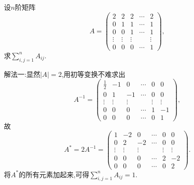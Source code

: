 \documentclass[lang=cn,newtx,10pt,scheme=chinese]{elegantbook}
\begin{document}
\begin{exercise}
设\(n\)阶矩阵
\[
A = 
\begin{pmatrix}
2 & 2 & 2 & \cdots & 2 \\
0 & 1 & 1 & \cdots & 1 \\
0 & 0 & 1 & \cdots & 1 \\
\vdots & \vdots & \vdots & & \vdots \\
0 & 0 & 0 & \cdots & 1
\end{pmatrix},
\]
求\(\sum_{i,j = 1}^{n} A_{ij}\).
\end{exercise}
\begin{solution}
    {\color{blue}解法一:}显然\(\vert A\vert = 2\),用初等变换不难求出
    \[
    A^{-1} = 
    \begin{pmatrix}
    \frac{1}{2} & -1 & 0 & \cdots & 0 & 0 \\
    0 & 1 & -1 & \cdots & 0 & 0 \\
    \vdots & \vdots & \vdots & & \vdots & \vdots \\
    0 & 0 & 0 & \cdots & 1 & -1 \\
    0 & 0 & 0 & \cdots & 0 & 1
    \end{pmatrix},
    \]
    故
    \[
    A^* = 2A^{-1} = 
    \begin{pmatrix}
    1 & -2 & 0 & \cdots & 0 & 0 \\
    0 & 2 & -2 & \cdots & 0 & 0 \\
    \vdots & \vdots & \vdots & & \vdots & \vdots \\
    0 & 0 & 0 & \cdots & 2 & -2 \\
    0 & 0 & 0 & \cdots & 0 & 2
    \end{pmatrix}.
    \]
    将\(A^*\)的所有元素加起来,可得\(\sum_{i,j = 1}^{n} A_{ij} = 1\).


\end{solution}
\end{document}

